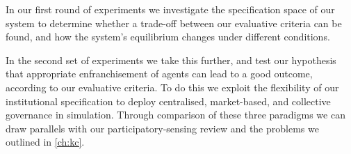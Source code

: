 In our first round of experiments we investigate
the specification space of our system to determine whether a trade-off between
our evaluative criteria can be found, and how the system's equilibrium changes
under different conditions.

In the second set of experiments we take this further, and test our hypothesis
that appropriate enfranchisement of agents can lead to a good outcome,
according to our evaluative criteria. To do this we exploit the flexibility of
our institutional specification to deploy centralised, market-based, and
collective governance in simulation. Through comparison of these three
paradigms we can draw parallels with our participatory-sensing review and the
problems we outlined in \autoref{ch:kc}.





